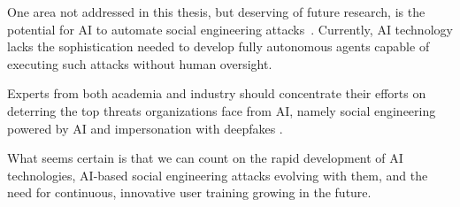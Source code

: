 





One area not addressed in this thesis, but deserving of future research, is the potential for AI to automate social engineering attacks~\citep{mirsky_Threat_Offensive_AI_Organizations_2023}. Currently, AI technology lacks the sophistication needed to develop fully autonomous agents capable of executing such attacks without human oversight.


Experts from both academia and industry should concentrate their efforts on deterring the top threats organizations face from AI, namely social engineering powered by AI and impersonation with deepfakes \citep{mirsky_Threat_Offensive_AI_Organizations_2023}.


What seems certain is that we can count on the rapid development of AI technologies, AI-based social engineering attacks evolving with them, and the need for continuous, innovative user training growing in the future.



